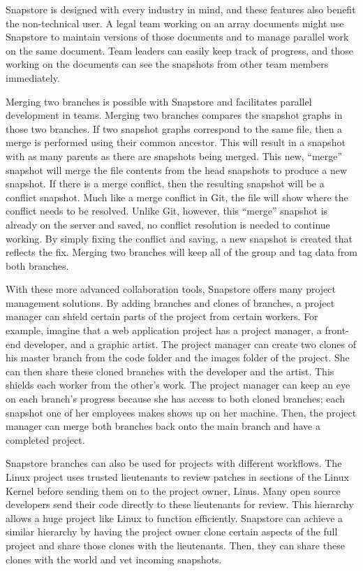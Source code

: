 Snapstore is designed with every industry in mind, and these features also benefit the non-technical user. A legal team working on an array documents might use Snapstore to maintain versions of those documents and to manage parallel work on the same document. Team leaders can easily keep track of progress, and those working on the documents can see the snapshots from other team members immediately.

Merging two branches is possible with Snapstore and facilitates parallel development in teams. Merging two branches compares the snapshot graphs in those two branches. If two snapshot graphs correspond to the same file, then a merge is performed using their common ancestor. This will result in a snapshot with as many parents as there are snapshots being merged. This new, ``merge'' snapshot will merge the file contents from the head snapshots to produce a new snapshot. If there is a merge conflict, then the resulting snapshot will be a conflict snapshot. Much like a merge conflict in Git, the file will show where the conflict needs to be resolved. Unlike Git, however, this ``merge'' snapshot is already on the server and saved, no conflict resolution is needed to continue working. By simply fixing the conflict and saving, a new snapshot is created that reflects the fix. Merging two branches will keep all of the group and tag data from both branches.

With these more advanced collaboration tools, Snapstore offers many project management solutions. By adding branches and clones of branches, a project manager can shield certain parts of the project from certain workers. For example, imagine that a web application project has a project manager, a front-end developer, and a graphic artist. The project manager can create two clones of his master branch from the code folder and the images folder of the project. She can then share these cloned branches with the developer and the artist. This shields each worker from the other's work. The project manager can keep an eye on each branch's progress because she has access to both cloned branches; each snapshot one of her employees makes shows up on her machine. Then, the project manager can merge both branches back onto the main branch and have a completed project.

Snapstore branches can also be used for projects with different workflows. The Linux project uses trusted lieutenants to review patches in sections of the Linux Kernel before sending them on to the project owner, Linus. Many open source developers send their code directly to these lieutenants for review. This hierarchy allows a huge project like Linux to function efficiently. Snapstore can achieve a similar hierarchy by having the project owner clone certain aspects of the full project and share those clones with the lieutenants. Then, they can share these clones with the world and vet incoming snapshots.


